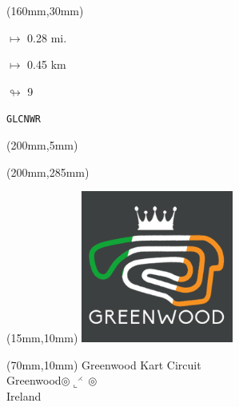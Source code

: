 \begin{textblock*}{40mm}(160mm,30mm)%
\Large
\par$\mapsto$ 0.28 mi.
\par$\mapsto$ 0.45 km
\par$\looparrowright$ 9
\par\hfill\tiny\tt GLCNWR\\
\end{textblock*}
\begin{textblock*}{20mm}(200mm,5mm)%
\fbox{\thepage}
\label{GLCNWR}
\end{textblock*}
\begin{textblock*}{20mm}(200mm,285mm)%
\fbox{\thepage}
\end{textblock*}

\null\newpage
\begin{textblock*}{50mm}(15mm,10mm)%
\includegraphics[width=50mm]{LG/GRWO.png}
\end{textblock*}
\begin{textblock*}{130mm}(70mm,10mm)%
{\fontsize{20}{20}\selectfont Greenwood Kart Circuit\\}
{\fontsize{16}{16}\selectfont Greenwood\hfill $\circledcirc\llcorner^{\rightthreetimes}\circledcirc$\\}
{\fontsize{12}{12}\selectfont Ireland\\}
\end{textblock*}
